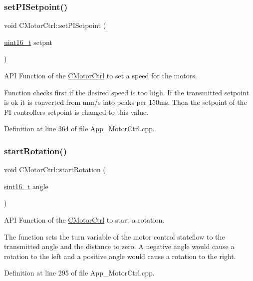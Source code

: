 \subsubsection{\texorpdfstring{set\+P\+I\+Setpoint()}{setPISetpoint()}}
{\footnotesize\ttfamily void C\+Motor\+Ctrl\+::set\+P\+I\+Setpoint (\begin{DoxyParamCaption}\item[{\mbox{\hyperlink{_a_d_a_s___types_8h_a1f1825b69244eb3ad2c7165ddc99c956}{uint16\+\_\+t}}}]{setpnt }\end{DoxyParamCaption})}



A\+PI Function of the \mbox{\hyperlink{class_c_motor_ctrl}{C\+Motor\+Ctrl}} to set a speed for the motors. 

Function checks first if the desired speed is too high. If the transmitted setpoint is ok it is converted from mm/s into peaks per 150ms. Then the setpoint of the PI controllers setpoint is changed to this value. 

Definition at line 364 of file App\+\_\+\+Motor\+Ctrl.\+cpp.

\mbox{\label{class_c_motor_ctrl_a1ee991f9511437a2e64ee75161063020}} 
\subsubsection{\texorpdfstring{start\+Rotation()}{startRotation()}}
{\footnotesize\ttfamily void C\+Motor\+Ctrl\+::start\+Rotation (\begin{DoxyParamCaption}\item[{\mbox{\hyperlink{_a_d_a_s___types_8h_ae4c9b951dbb7355563c313abca5e2e75}{sint16\+\_\+t}}}]{angle }\end{DoxyParamCaption})}



A\+PI Function of the \mbox{\hyperlink{class_c_motor_ctrl}{C\+Motor\+Ctrl}} to start a rotation. 

The function sets the turn variable of the motor control stateflow to the transmitted angle and the distance to zero. A negative angle would cause a rotation to the left and a positive angle would cause a rotation to the right. 

Definition at line 295 of file App\+\_\+\+Motor\+Ctrl.\+cpp.


